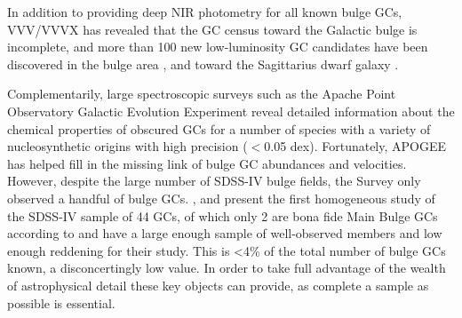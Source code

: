 \documentclass[longauth]{aa} %
\begin{document}
In addition to providing deep NIR photometry for all known bulge GCs, VVV/VVVX  has revealed that the GC census toward the Galactic bulge is incomplete, and more than 100 new low-luminosity GC candidates have been discovered in the bulge area \citep{Minniti2017a, Minniti2017b,  Minniti2017c, Minniti2018b, Ryu2018, Bica2018, Ramos2018, Camargo2018, Camargo2019, Minniti2019, Gran2019, Palma2019, Minniti2020, Garro2021}, and toward the Sagittarius dwarf galaxy \citep[see, e.g.,][]{Minniti2021a}. 

Complementarily, large spectroscopic surveys such as the Apache Point Observatory Galactic Evolution Experiment \citep[APOGEE;][]{Majewski2017} reveal detailed information about the chemical properties of  obscured GCs for a number of species with a variety of nucleosynthetic origins with high precision ($<$0.05 dex). Fortunately, APOGEE has helped fill in the missing link of bulge GC abundances and velocities. However, despite the large number of SDSS-IV bulge fields, the Survey only observed a handful of  bulge GCs. \citet{Masseron2019}, \citet{Meszaros2020} and \citet{Meszaros2021} present the first homogeneous study of the SDSS-IV sample of 44 GCs, of which only 2 are bona fide Main Bulge GCs according to \citet{Massari2019} and have a large enough sample of well-observed members and low enough reddening for their study. This is <4\% of the total number of bulge GCs known, a disconcertingly low value. In order to take full advantage of the wealth of astrophysical detail these key objects can provide, as complete a sample as possible is essential.
\end{document}
